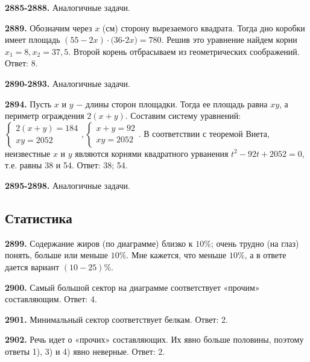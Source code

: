 \textbf{2885-2888.} Аналогичные задачи.

\textbf{2889.} Обозначим через $x$ (см) сторону вырезаемого квадрата. Тогда дно коробки имеет площадь $(55 - 2x)\cdot(36 $-$ 2x)=780$. Решив это уравнение найдем корни $x_1=8, x_2=37,5.$ Второй корень отбрасываем из геометрических соображений. \newline \null \hspace*{\fill} Ответ: 8. 

\textbf{2890-2893.} Аналогичные задачи.

\textbf{2894.} Пусть $x$ и $y$ $-$ длины сторон площадки. Тогда ее площадь равна $xy$, а периметр ограждения $2(x+y).$ Составим систему уравнений:\newline$
\begin{cases}
	2(x+y)=184\\
	xy=2052
\end{cases},
\begin{cases}
	x + y = 92\\
	xy=2052
\end{cases}$.
В соответствии с теоремой Виета, неизвестные $x$ и $y$ являются корнями квадратного урванения $t^2 - 92t + 2052 = 0$, т.е. равны 38 и 54. \newline \null \hspace*{\fill} Ответ: 38; 54. 

\textbf{2895-2898.} Аналогичные задачи.


\subsection{Статистика}

\textbf{2899.} Содержание жиров (по диаграмме) близко к $10\%$; очень трудно (на глаз) понять, больше или меньше $10\%.$ Мне кажется, что меньше $10\%$, а в ответе дается вариант  $(10-25)\%$.

\textbf{2900.} Самый большой сектор на диаграмме соответствует «прочим» составляющим. \newline \null \hspace*{\fill} Ответ: 4. 

\textbf{2901.} Минимальный сектор соответствует белкам. \newline \null \hspace*{\fill} Ответ: 2. 

\textbf{2902.} Речь идет о «прочих» составляющих. Их явно больше половины, поэтому ответы 1), 3) и 4) явно неверные. \newline \null \hspace*{\fill} Ответ: 2. 

